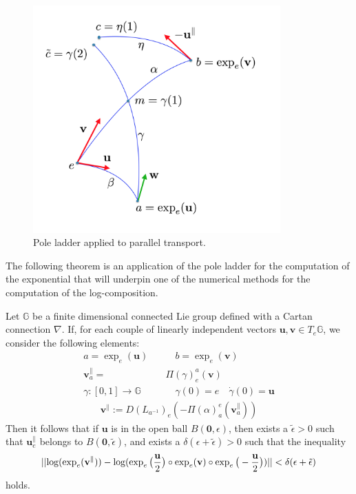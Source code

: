 \begin{figure}[htbp]
	\centering
	\includegraphics[width=9.5cm]{figures/theorem_pict.png}
	\caption{Pole ladder applied to parallel transport.}
	\label{fig:theorem_pict}
\end{figure}
\noindent
The following theorem is an application of the pole ladder \cite{lorenzi2011schild} for the computation of the exponential that will underpin one of the numerical methods for the computation of the log-composition.
\begin{theorem}\label{th:local_approximation_theorem}
	Let $\mathbb{G}$ be a finite dimensional connected Lie group defined with a Cartan connection $\nabla$. 
	If, for each couple of linearly independent vectors $\mathbf{u}, \mathbf{v} \in T_{e}\mathbb{G}$, we consider the following elements:
	\begin{align*}
	a = \exp_{e}(\mathbf{u}) 
	\quad & \quad  
	b = \exp_{e}(\mathbf{v}) \\
	\mathbf{v}_{a}^{\parallel} = & \Pi(\gamma)_{e}^{a}(\mathbf{v})\\
	\gamma : [0,1] \rightarrow \mathbb{G} &\quad \gamma(0) = e \quad \dot{\gamma}(0) = \mathbf{u}
	\end{align*}
	\begin{align*}
	 \mathbf{v}^{\parallel} := D(L_{a^{-1}})_{e}( -\Pi(\alpha)_{a}^{e}(\mathbf{v}_{a}^{\parallel}))
	\end{align*}
	Then it follows that if $\mathbf{u}$ is in the open ball $B(\mathbf{0}, \epsilon)$, then exists a  $\tilde{\epsilon}>0$ such that $\mathbf{u}_{e}^{\parallel}$ belongs to $B(\mathbf{0}, \tilde{\epsilon})$, and exists a $\delta(\epsilon + \tilde{\epsilon})>0$ such that the inequality
	\begin{align*}
		\vert\lvert 
			\log(\exp_{e}(\mathbf{v}^{\parallel} ))
			-
			\log(\exp_{e}\big(\frac{\mathbf{u}}{2}\big)   
				\circ  \exp_{e}(\mathbf{v}) 
				\circ \exp_{e}\big(-\frac{\mathbf{u}}{2}\big))
			 \rvert\vert <\delta(\epsilon + \tilde{\epsilon})
	\end{align*}
	holds.
\end{theorem}
